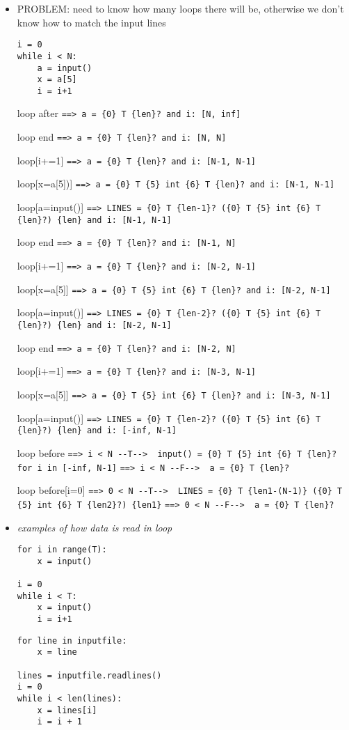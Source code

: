 \documentclass[11pt]{article}
\begin{document}
\begin{itemize}

\item PROBLEM: need to know how many loops there will be, otherwise we don't know how to match the input lines

\begin{lstlisting}[numbers=none]
i = 0
while i < N:
    a = input()
    x = a[5]
    i = i+1
\end{lstlisting}

loop after \verb|==> a = {0} T {len}? and i: [N, inf]|

loop end \verb|==> a = {0} T {len}? and i: [N, N]|

loop[i+=1] \verb|==> a = {0} T {len}? and i: [N-1, N-1]|

loop[x=a[5])] \verb|==> a = {0} T {5} int {6} T {len}? and i: [N-1, N-1]|

loop[a=input()] \verb|==> LINES = {0} T {len-1}? ({0} T {5} int {6} T {len}?) {len} and i: [N-1, N-1]|

loop end \verb|==> a = {0} T {len}? and i: [N-1, N]|

loop[i+=1] \verb|==> a = {0} T {len}? and i: [N-2, N-1]|

loop[x=a[5]] \verb|==> a = {0} T {5} int {6} T {len}? and i: [N-2, N-1]|

loop[a=input()] \verb|==> LINES = {0} T {len-2}? ({0} T {5} int {6} T {len}?) {len} and i: [N-2, N-1]|

loop end \verb|==> a = {0} T {len}? and i: [N-2, N]|

loop[i+=1] \verb|==> a = {0} T {len}? and i: [N-3, N-1]|

loop[x=a[5]] \verb|==> a = {0} T {5} int {6} T {len}? and i: [N-3, N-1]|

loop[a=input()] \verb|==> LINES = {0} T {len-2}? ({0} T {5} int {6} T {len}?) {len} and i: [-inf, N-1]|

loop before \verb|==> i < N --T-->  input() = {0} T {5} int {6} T {len}? for i in [-inf, N-1]| \verb|==> i < N --F-->  a = {0} T {len}?|

loop before[i=0] \verb|==> 0 < N --T-->  LINES = {0} T {len1-(N-1)} ({0} T {5} int {6} T {len2}?) {len1}| \verb|==> 0 < N --F-->  a = {0} T {len}?|


\item \textit{examples of how data is read in loop}

\begin{lstlisting}[numbers=none]
for i in range(T):
    x = input()
    
i = 0
while i < T:
    x = input()
    i = i+1
\end{lstlisting}

\begin{lstlisting}[numbers=none]
for line in inputfile:
    x = line
    
lines = inputfile.readlines()
i = 0
while i < len(lines):
    x = lines[i]
    i = i + 1
\end{lstlisting}
\end{itemize}
\end{document}
